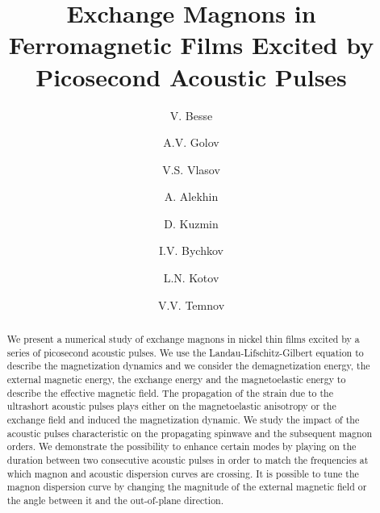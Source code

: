 \documentclass[%
superscriptaddress,
preprint,
showpacs,
amsmath,
amssymb,
aps,
prl,
]{revtex4-1}
\begin{document}
	
\title{Exchange Magnons in Ferromagnetic Films Excited by Picosecond Acoustic Pulses}
	
\author{V. Besse}
\author{A.V. Golov}
\author{V.S. Vlasov}
\author{A. Alekhin}
\author{D. Kuzmin}
\author{I.V. Bychkov}
\author{L.N. Kotov}
\author{V.V. Temnov}
	
\begin{abstract}
We present a numerical study of exchange magnons in nickel thin films excited by a series of picosecond acoustic pulses.
We use the Landau-Lifschitz-Gilbert equation to describe the magnetization dynamics and we consider the demagnetization energy, the external magnetic energy, the exchange energy and the magnetoelastic energy to describe the effective magnetic field.
The propagation of the strain due to the ultrashort acoustic pulses plays either on the magnetoelastic anisotropy or the exchange field and induced the magnetization dynamic.
We study the impact of the acoustic pulses characteristic on the propagating spinwave and the subsequent magnon orders.
We demonstrate the possibility to enhance certain modes by playing on the duration between two consecutive acoustic pulses in order to match the frequencies at which magnon and acoustic dispersion curves are crossing.
It is possible to tune the magnon dispersion curve by changing the magnitude of the external magnetic field or the angle between it and the out-of-plane direction.
\end{abstract}
	
\maketitle
	
\end{document}
